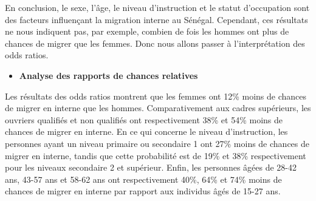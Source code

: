 \documentclass[a4paper,12pt]{article}
\begin{document}
En conclusion, le sexe, l'âge, le niveau d'instruction et le statut d'occupation sont des facteurs influençant la migration interne au Sénégal. Cependant, ces résultats ne nous indiquent pas, par exemple, combien de fois les hommes ont plus de chances de migrer que les femmes. Donc nous allons passer à l’interprétation des odds ratios.\\

\vspace{3mm}


\newpage 

\begin{itemize}
	\item \textbf{Analyse des rapports de chances relatives}
\end{itemize}

Les résultats des odds ratios montrent que les femmes ont 12\% moins de chances de migrer en interne que les hommes. Comparativement aux cadres supérieurs, les ouvriers qualifiés et non qualifiés ont respectivement 38\% et 54\% moins de chances de migrer en interne. En ce qui concerne le niveau d'instruction, les personnes ayant un niveau primaire ou secondaire 1 ont 27\% moins de chances de migrer en interne, tandis que cette probabilité est de 19\% et 38\% respectivement pour les niveaux secondaire 2 et supérieur. Enfin, les personnes âgées de 28-42 ans, 43-57 ans et 58-62 ans ont respectivement 40\%, 64\% et 74\% moins de chances de migrer en interne par rapport aux individus âgés de 15-27 ans.
\end{document}
